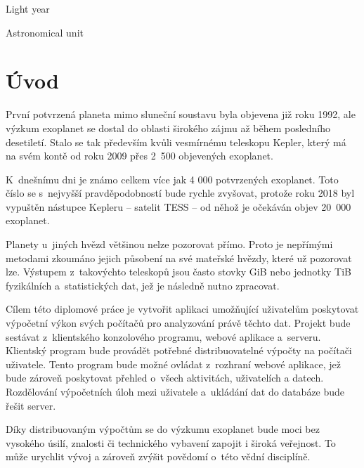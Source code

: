 \documentclass[a4paper,12pt]{article}
\begin{document}
\deskpage
\mainpage
\assignment
\statement
\acknowledgment
\annotationcs	
\annotationen
\content
\imglist
\tablelist
\codelist
\formulalist
\shortlist

\begin{description}[font=\mdseries,leftmargin=6em,labelwidth=!,]
\item[ly]		Light year
\item[AU]		Astronomical unit
\end{description}

\clearpage\pagestyle{plain}
\section*{Úvod}
\label{uvod}

První potvrzená planeta mimo sluneční soustavu byla objevena již roku 1992, ale výzkum exoplanet se dostal do oblasti širokého zájmu až během posledního desetiletí. Stalo se tak především kvůli vesmírnému teleskopu Kepler, který má na svém kontě od roku 2009 přes 2~500 objevených exoplanet.

K~dnešnímu dni je známo celkem více jak 4 000 potvrzených exoplanet. Toto číslo se s~nejvyšší pravděpodobností bude rychle zvyšovat, protože roku 2018 byl vypuštěn nástupce Kepleru -- satelit TESS -- od něhož je očekáván objev 20~000 exoplanet.

Planety u~jiných hvězd většinou nelze pozorovat přímo. Proto je nepřímými metodami zkoumáno jejich působení na své mateřské hvězdy, které už pozorovat lze. Výstupem z~takovýchto teleskopů jsou často stovky GiB nebo jednotky TiB fyzikálních a~statistických dat, jež je následně nutno zpracovat.

Cílem této diplomové práce je vytvořit aplikaci umožňující uživatelům poskytovat výpočetní výkon svých počítačů pro analyzování právě těchto dat. Projekt bude sestávat z~klientského konzolového programu, webové aplikace a~serveru. Klientský program bude provádět potřebné distribuovatelné výpočty na počítači uživatele. Tento program bude možné ovládat z~rozhraní webové aplikace, jež bude zároveň poskytovat přehled o~všech aktivitách, uživatelích a datech. Rozdělování výpočetních úloh mezi uživatele a~ukládání dat do databáze bude řešit server.

Díky distribuovaným výpočtům se do výzkumu exoplanet bude moci bez vysokého úsilí, znalosti či technického vybavení zapojit i široká veřejnost. To může urychlit vývoj a zároveň zvýšit povědomí o~této vědní disciplíně.
\end{document}
